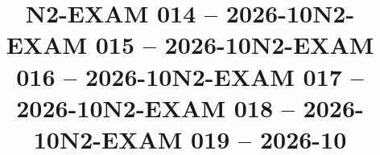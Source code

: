 \documentclass{ip-exam}
\begin{document}







\cleartoeven
\setcounter{questioncounter}{0}
\setcounter{page}{1}
\title{N2-EXAM 014 -- 2026-10}
\makeexamheader








\cleartoeven
\setcounter{questioncounter}{0}
\setcounter{page}{1}
\title{N2-EXAM 015 -- 2026-10}
\makeexamheader








\cleartoeven
\setcounter{questioncounter}{0}
\setcounter{page}{1}
\title{N2-EXAM 016 -- 2026-10}
\makeexamheader








\cleartoeven
\setcounter{questioncounter}{0}
\setcounter{page}{1}
\title{N2-EXAM 017 -- 2026-10}
\makeexamheader








\cleartoeven
\setcounter{questioncounter}{0}
\setcounter{page}{1}
\title{N2-EXAM 018 -- 2026-10}
\makeexamheader








\cleartoeven
\setcounter{questioncounter}{0}
\setcounter{page}{1}
\title{N2-EXAM 019 -- 2026-10}
\makeexamheader
\end{document}
